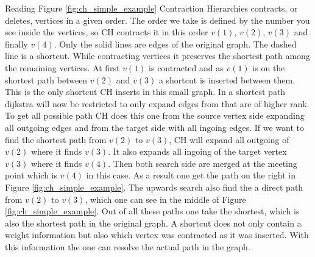 Reading Figure \ref{fig:ch_simple_example} Contraction Hierarchies contracts, or deletes, vertices in a given order. 
The order we take is defined by the number you see inside the vertices, so CH contracts it in this order $v(1)$, $v(2)$, $v(3)$ and finally $v(4)$.
Only the solid lines are edges of the original graph.
The dashed line is a shortcut.
While contracting vertices it preserves the shortest path among the remaining vertices.
At first $v(1)$ is contracted and as $v(1)$ is on the shortest path between $v(2)$ and $v(3)$ a shortcut is inserted between them.
This is the only shortcut CH inserts in this small graph.
In a shortest path dijkstra will now be restricted to only expand edges from that are of higher rank.
To get all possible path CH does this one from the source vertex side expanding all outgoing edges and from the target side with all ingoing edges.
If we want to find the shortest path from $v(2)$ to $v(3)$, CH will expand all outgoing of $v(2)$ where it finds $v(3)$.
It also expands all ingoing of the target vertex $v(3)$ where it finds $v(4)$. 
Then both search side are merged at the meeting point which is $v(4)$ in this case.
As a result one get the path on the right in Figure \ref{fig:ch_simple_example}. 
The upwards search also find the a direct path from $v(2)$ to $v(3)$, which one can see in the middle of Figure \ref{fig:ch_simple_example}. 
Out of all these paths one take the shortest, which is also the shortest path in the original graph.
A shortcut does not only contain a weight information but also which vertex was contracted as it was inserted.
With this information the one can resolve the actual path in the graph.